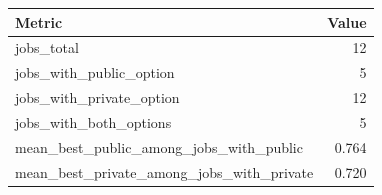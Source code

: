 \begin{tabular}{lr}
\hline
Metric & Value \\
\hline
jobs_total & 12 \\
jobs_with_public_option & 5 \\
jobs_with_private_option & 12 \\
jobs_with_both_options & 5 \\
mean_best_public_among_jobs_with_public & 0.764 \\
mean_best_private_among_jobs_with_private & 0.720 \\
\hline
\end{tabular}
